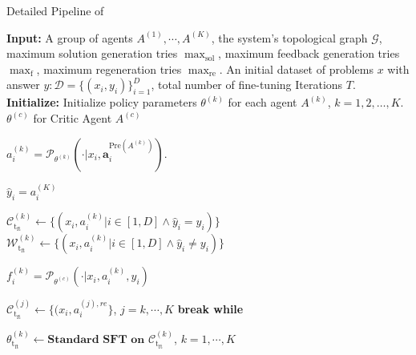\begin{algorithm}[htbp]
\caption{Detailed Pipeline of \model{}}
\begin{algorithmic}[1]
\STATE \textbf{Input:} A group of agents $A^{(1)},\cdots,A^{(K)}$, the system's  topological graph $\mathcal{G}$, maximum solution generation tries $\max_\text{sol}$, maximum feedback generation tries $\max_\text{f}$, maximum  regeneration tries $\max_\text{re}$. 
An initial dataset of problems $x$ with answer $y:\mathcal{D} = \{(x_i, y_i)\}_{i=1}^D$, total number of fine-tuning Iterations $T$.
\STATE \textbf{Initialize:} Initialize policy parameters $\theta^{(k)}$ for each agent $A^{(k)}$, $k = 1, 2, \dots, K$. $\theta^{(c)}$  for Critic Agent $A^{(c)}$

         \STATE $a_i^{(k)}=\mathcal{P}_{\theta^{(k)}}(\cdot|x_i,\textbf{a}_i^{\mathrm{Pre}(A^{(k)})})$.
        
        \STATE $\hat{y}_i=a_i^{(K)}$    
            
        
            \STATE $\mathcal{C}_{\text{t}_\text{ft}}^{(k)}\leftarrow \{(x_i, a_i^{(k)}| i \in [1,D] \land \hat{y}_i=y_i )\}$ 
            \STATE $\mathcal{W}_{\text{t}_\text{ft}}^{(k)}\leftarrow \{(x_i, a_i^{(k)}| i \in [1,D] \land \hat{y}_i\neq y_i )\}$ 
                
                    \STATE $ f_i^{(k)}=\mathcal{P}_{\theta^{(c)}}(\cdot | x_i,a_i^{(k)},y_i)$
                   
                        \STATE $\mathcal{C}_{\text{t}_\text{ft}}^{(j)}\leftarrow \{(x_i, a_i^{(j),re} \}$, $j=k, \cdots, K$
                        \STATE \textbf{break while}
                    \ENDIF
                    \ENDWHILE
                \ENDWHILE
            \ENDFOR
        \ENDFOR
        
    \ENDWHILE
    \STATE $\theta^{(k)}_{\text{t}_\text{ft}} \leftarrow \textbf{Standard SFT on }\mathcal{C}_{\text{t}_\text{ft}}^{(k)}$, $k=1,\cdots,K$
\ENDFOR
\end{algorithmic}
\end{algorithm}


